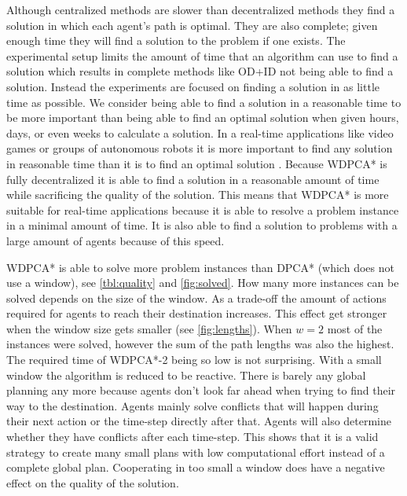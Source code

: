 Although centralized methods are slower than decentralized methods they find a 
solution in which each agent's path is optimal. They are
also complete; given enough time they will find a solution to the problem if 
one exists. The experimental setup limits the amount of time that an algorithm 
can use to find a solution which results in complete methods like OD+ID not 
being able to find a solution.
Instead the experiments are focused on finding a solution in as
little time as possible. We consider being able to find a solution in
a reasonable time to be more important than being able to find an optimal 
solution when
given hours, days, or even weeks to calculate a solution. In a real-time 
applications
like video games or groups of autonomous robots it is more important to find any
solution in reasonable time than it is to find an optimal solution
\cite{botea2013}.
Because WDPCA* is fully decentralized it is able to find a solution in a
reasonable amount of time while sacrificing the quality of the solution. This
means that WDPCA* is more suitable for real-time applications because it is
able to resolve a problem instance in a minimal amount of time. It is also able 
to
find a solution to problems with a large amount of agents because of this speed.

WDPCA* is able to solve more problem instances than DPCA* (which does not use a 
window), see \autoref{tbl:quality} and \autoref{fig:solved}. How many more 
instances can be solved depends on the
size of the window. As a trade-off the amount of actions required for agents to
reach their destination increases. This effect get stronger when the window
size gets smaller (see \autoref{fig:lengths}). When $w=2$ most of the instances 
were solved, however the
sum of the path lengths was also the highest. The required time of WDPCA*-2 
being so low is not surprising. With a small window the algorithm is reduced to 
be
reactive. There is barely any global planning any more because agents don't
look far ahead when trying to find their way to the destination. Agents mainly
solve conflicts that will happen during their next action or the time-step 
directly after that. Agents will also determine whether they have
conflicts after each time-step. This shows that it is a valid strategy to create
many small plans with low computational effort instead of a complete global
plan. Cooperating in too small a window does have a negative effect on the
quality of the solution.

